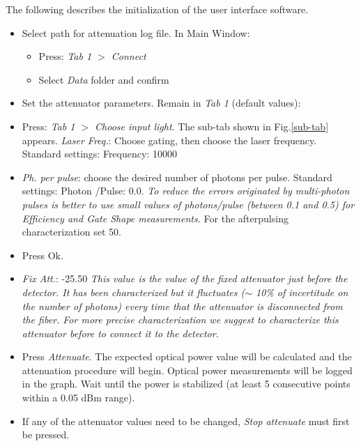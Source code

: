 \documentclass{article}
\begin{document}
The following describes the initialization of the user interface software.

\begin{itemize}

\item
Select path for attenuation log file. In Main Window:
\begin{itemize}
\item
Press: \emph{Tab 1 $>$ Connect}
\item 
Select \emph{Data} folder and confirm
\end{itemize}

\label{sec:soft_init}

\item
Set the attenuator parameters. Remain in \emph{Tab 1} (default values):
\end{itemize}

\begin{itemize}
\item
Press: \emph{Tab 1 $>$ Choose input light}. The sub-tab shown in Fig.\ref{sub-tab} appears.
\emph{Laser Freq.}: Choose gating, then choose the laser frequency. Standard settings: Frequency: 10000
\item
\emph{Ph. per pulse}: choose the desired number of photons per pulse. Standard settings: Photon /Pulse: 0.0.
{ \it To reduce the errors originated by multi-photon pulses is better to use small values of photons/pulse (between 0.1 and 0.5) for Efficiency and Gate Shape measurements.} For the afterpulsing characterization set 50.
\item
Press Ok.
\item
\emph{Fix Att.}: -25.50 {\it This value is the value of the fixed attenuator just before the detector. It has been characterized but it fluctuates ($\sim$ 10\% of incertitude on the number of photons) every time that the attenuator is disconnected from the fiber. For more precise characterization we suggest to characterize this attenuator before to connect it to the detector.}
\item
Press \emph{Attenuate}. The expected optical power value will be calculated and the attenuation procedure will begin. Optical power measurements will be logged in the graph. Wait until the power is stabilized (at least 5 consecutive points within a 0.05 dBm range).
\item
If any of the attenuator values need to be changed, \emph{Stop attenuate} must first be pressed. 

\end{itemize}
\end{document}
